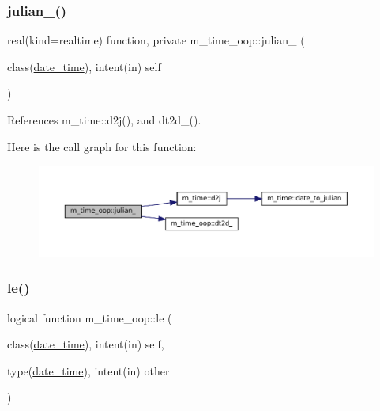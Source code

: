 \subsubsection{\texorpdfstring{julian\+\_\+()}{julian\_()}}
{\footnotesize\ttfamily real(kind=realtime) function, private m\+\_\+time\+\_\+oop\+::julian\+\_\+ (\begin{DoxyParamCaption}\item[{class(\mbox{\hyperlink{structm__time__oop_1_1date__time}{date\+\_\+time}}), intent(in)}]{self }\end{DoxyParamCaption})\hspace{0.3cm}{\ttfamily [private]}}



References m\+\_\+time\+::d2j(), and dt2d\+\_\+().

Here is the call graph for this function\+:\nopagebreak
\begin{figure}[H]
\begin{center}
\leavevmode
\includegraphics[width=350pt]{namespacem__time__oop_a85c4d4edaa644bf22f68ffd724de036a_cgraph}
\end{center}
\end{figure}
\mbox{\label{namespacem__time__oop_a5e04ff772ac6d72f68031ec43c1e6c84}} 
\subsubsection{\texorpdfstring{le()}{le()}}
{\footnotesize\ttfamily logical function m\+\_\+time\+\_\+oop\+::le (\begin{DoxyParamCaption}\item[{class(\mbox{\hyperlink{structm__time__oop_1_1date__time}{date\+\_\+time}}), intent(in)}]{self,  }\item[{type(\mbox{\hyperlink{structm__time__oop_1_1date__time}{date\+\_\+time}}), intent(in)}]{other }\end{DoxyParamCaption})\hspace{0.3cm}{\ttfamily [private]}}



